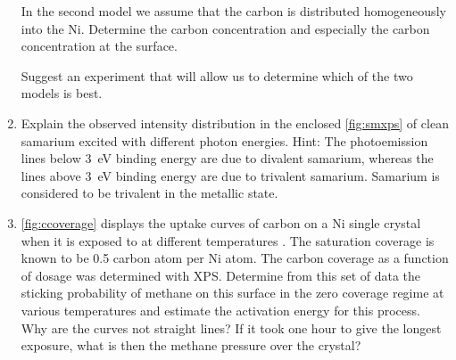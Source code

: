 \begin{enumerate}
In the second model we assume that the carbon is distributed homogeneously into the Ni. Determine the carbon concentration and especially the carbon concentration at the surface.

Suggest an experiment that will allow us to determine which of the two models is best.

\item Explain the observed intensity distribution in the enclosed \autoref{fig:smxps} of clean samarium excited with different photon energies. Hint: The photoemission lines below \SI{3}{\electronvolt} binding energy are due to divalent samarium, whereas the lines above \SI{3}{\electronvolt} binding energy are due to trivalent samarium. Samarium is considered to be trivalent in the metallic state.

\item \autoref{fig:ccoverage} displays the uptake curves of carbon on a Ni single crystal when it is exposed to  at different temperatures \cite{chorkendorff2}. The saturation coverage is known to be 0.5 carbon atom per Ni atom. The carbon coverage as a function of dosage was determined with XPS. Determine from this set of data the sticking probability of methane on this surface in the zero coverage regime at various temperatures and estimate the activation energy for this process. Why are the curves not straight lines? If it took one hour to give the longest exposure, what is then the methane pressure over the crystal?
\end{enumerate}

